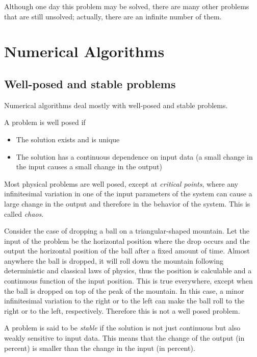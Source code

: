 \documentclass[justified, sixbynine]{tufte-book}
\theoremstyle{plain}%
\newtheorem * {corollary}{Corollary}
\theoremstyle{definition}
\theoremstyle{remark}
\newtheorem * {remark}{Remark}
\newtheorem * {note}{Note}
\begin{document}
\begin{fullwidth}
Although one day this problem may be solved, there are many other problems that
are still unsolved; actually, there are an infinite number of them.

\chapter{Numerical Algorithms}

\goodbreak\section{Well-posed and stable problems}


Numerical algorithms deal mostly with well-posed and stable problems.

A problem is well posed if
\begin{itemize}
\item The solution exists and is unique
\item The solution has a continuous dependence on input data (a small change in the input causes a small change in the output)
\end{itemize}


Most physical problems are well posed, except at {\it critical points}, where any infinitesimal variation in one of the input parameters of the system can cause a large change in the output and therefore in the behavior of the system. This is called {\it chaos}.

Consider the case of dropping a ball on a triangular-shaped mountain. Let the input of the problem be the horizontal position where the drop occurs and the output the horizontal position of the ball after a fixed amount of time. Almost anywhere the ball is dropped, it will roll down the mountain following deterministic and classical laws of physics, thus the position is calculable and a continuous function of the input position. This is true everywhere, except when the ball is dropped on top of the peak of the mountain. In this case, a minor infinitesimal variation to the right or to the left can make the ball roll to the right or to the left, respectively.  Therefore this is not a well posed problem.

A problem is said to be {\it stable} if the solution is not just continuous but also weakly sensitive to input data. This means that the change of the output (in percent) is smaller than the change in the input (in percent).


\end{fullwidth}
\end{document}
